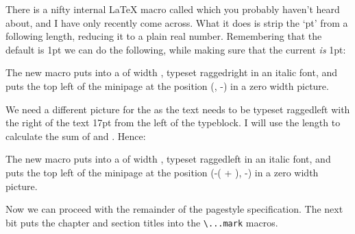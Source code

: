     There is a nifty internal LaTeX macro called \cmd{\strip@pt} which you
probably haven't heard about, and I have only recently come across. What it
does is strip the `pt' from a following length, reducing it to a plain 
real number. Remembering that the default \lnc{\unitlength} is 1pt we can
do the following, while making sure that the current \lnc{\unitlength}
\emph{is} 1pt:
\begin{lcode}
\makeatletter
\newcommand{\bringpicr}[1]{%
  \setlength{\unitlength}{1pt}
  \begin{picture}(0,0)
    \put(\strip@pt\marginparsep, -\strip@pt\pwlayi){%
      \begin{minipage}[t]{\marginparwidth}
        \raggedright\itshape #1
      \end{minipage}}
  \end{picture}
}
\makeatother
\end{lcode}
The new macro \cmd{\bringpicr} puts  
into a  of width \lnc{\marginparwidth}, 
typeset raggedright in an italic font, and puts the top
left of the minipage at the position (\lnc{\marginparsep}, -\lnc{\pwlayi}) 
in a zero width picture.

    We need a different picture for the  as the text needs to be
typeset raggedleft with the right of the text 17pt from the left of the
typeblock. I will use the length \lnc{\pwlayii} 
to calculate the sum of \lnc{\marginparsep}
and \lnc{\marginparwidth}. Hence:
\begin{lcode}
\makeatletter
\setlength{\pwlayii}{\marginparsep}
\addtolength{\pwlayii}{\marginparwidth}
\newcommand{\bringpicl}[1]{%
  \setlength{\unitlength}{1pt}
  \begin{picture}(0,0)
    \put(-\strip@pt\pwlayii, -\strip@pt\pwlayi){%
      \begin{minipage}[t]{\marginparwidth}
        \raggedleft\itshape #1
      \end{minipage}}
  \end{picture}
}
\makeatother
\end{lcode}
The new macro \cmd{\bringpicl} puts  
into a  of width \lnc{\marginparwidth}, 
typeset raggedleft in an italic font, and puts the top
left of the minipage at the position 
(-(\lnc{\marginparsep} + \lnc{\marginparwidth}), -\lnc{\pwlayi}) 
in a zero width picture.


    Now we can proceed with the remainder of the pagestyle specification.
The next bit puts the chapter and section titles into the \verb?\...mark? 
macros.
\begin{lcode}
\makeatletter
{}
\makeatother
\end{lcode}

